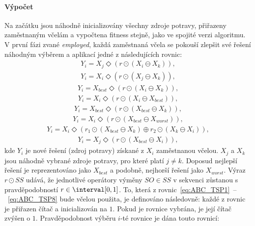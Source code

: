 \paragraph{Výpočet}
Na začátku jsou náhodně inicializovány všechny zdroje potravy, přiřazeny zaměstnaným včelám a vypočtena fitness stejně, jako ve spojité verzi algoritmu. V první fázi zvané \emph{employed}, každá zaměstnaná včela se pokouší zlepšit své řešení náhodným výběrem a aplikací jedné z následujících rovnic:
\begin{align}
    \label{eq:ABC_TSP1}
    Y_i = X_j \Diamond (r \odot (X_i \ominus X_k)),
\end{align}
\begin{align}
    \label{eq:ABC_TSP2}
    Y_i = X_i \Diamond (r \odot (X_j \ominus X_k)),
\end{align}
\begin{align}
    \label{eq:ABC_TSP3}
    Y_i = X_{best} \Diamond (r \odot (X_i \ominus X_k)),
\end{align}
\begin{align}
    \label{eq:ABC_TSP4}
    Y_i = X_i \Diamond (r \odot (X_i \ominus X_{best})),
\end{align}
\begin{align}
    \label{eq:ABC_TSP5}
    Y_i = X_{best} \Diamond (r \odot (X_{best} \ominus X_k)),
\end{align}
\begin{align}
    \label{eq:ABC_TSP6}
    Y_i = X_i \Diamond (r \odot (X_{best} \ominus X_{worst})),
\end{align}
\begin{align}
    \label{eq:ABC_TSP7}
    Y_i = X_i \Diamond (r_1 \odot (X_{best} \ominus X_k) \oplus r_2 \odot (X_k \ominus X_i)),
\end{align}
\begin{align}
    \label{eq:ABC_TSP8}
    Y_i = X_j \Diamond (r \odot (X_{best} \ominus X_i)),
\end{align}
kde $Y_i$ je nové řešení (zdroj potravy) získané z $X_i$ zaměstnanou včelou. $X_j$ a $X_k$ jsou náhodně vybrané zdroje potravy, pro které platí $j \neq k$. Doposud nejlepší řešení je reprezentováno jako $X_{best}$ a podobně, nejhorší řešení jako $X_{worst}$. Výraz $r \odot SS$ udává, že jednotlivé operátory výměny $SO \in SS$ v sekvenci zůstanou s pravděpodobností $r \in \interval[{0,1}]$. To, která z rovnic~\ref{eq:ABC_TSP1}~--~\ref{eq:ABC_TSP8} bude včelou použita, je definováno následovně: každé z rovnic je přiřazen čítač a inicializován na $1$. Pokud je rovnice vybrána, je její čítač zvýšen o $1$. Pravděpodobnost výběru $i$-té rovnice je dána touto rovnicí:

